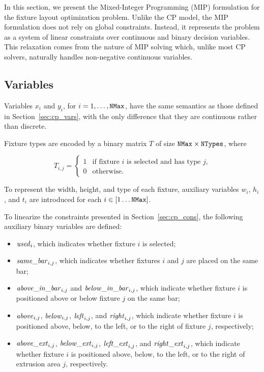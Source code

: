 \label{sec:mip_model}

In this section, we present the Mixed-Integer Programming (MIP) formulation for the fixture layout optimization problem. Unlike the CP model, the MIP formulation does not rely on global constraints. Instead, it represents the problem as a system of linear constraints over continuous and binary decision variables. This
relaxation comes from the nature of MIP solving which, unlike most CP solvers, naturally handles
non-negative continuous variables.


\subsection{Variables}
Variables \(x_i\) and \(y_i\), for \(i=1,\dots,\mathtt{NMax}\), have the same semantics as those defined in Section~\ref{sec:cp_vars}, with the only difference that they are continuous rather than discrete.

Fixture types are encoded by a binary matrix \(T\) of size \(\mathtt{NMax} \times \mathtt{NTypes}\), where

\[
T_{i,j} =
\begin{cases}
	1 & \text{if fixture \(i\) is selected and has type \(j\),}\\
	0 & \text{otherwise.}
\end{cases}
\]

To represent the width, height, and type of each fixture, auxiliary variables \(w_i\), \(h_i\), and \(t_i\) are introduced for each \(i \in [1 \ldots \mathtt{NMax}]\).

To linearize the constraints presented in Section~\ref{sec:cp_cons}, the following auxiliary binary variables are defined:

\begin{itemize}
	\item \(\mathit{used}_i\), which indicates whether fixture \(i\) is selected;
	\item \(\mathit{same\_bar}_{i,j}\), which indicates whether fixtures \(i\) and \(j\) are placed on the same bar;
	\item \(\mathit{above\_in\_bar}_{i,j}\) and \(\mathit{below\_in\_bar}_{i,j}\), which indicate whether fixture \(i\) is positioned above or below fixture \(j\) on the same bar;
	\item \(\mathit{above}_{i,j}\), \(\mathit{below}_{i,j}\), \(\mathit{left}_{i,j}\), and \(\mathit{right}_{i,j}\), which indicate whether fixture \(i\) is positioned above, below, to the left, or to the right of fixture \(j\), respectively;
	\item \(\mathit{above\_ext}_{i,j}\), \(\mathit{below\_ext}_{i,j}\), \(\mathit{left\_ext}_{i,j}\), and \(\mathit{right\_ext}_{i,j}\), which indicate whether fixture \(i\) is positioned above, below, to the left, or to the right of extrusion area \(j\), respectively.
\end{itemize}



